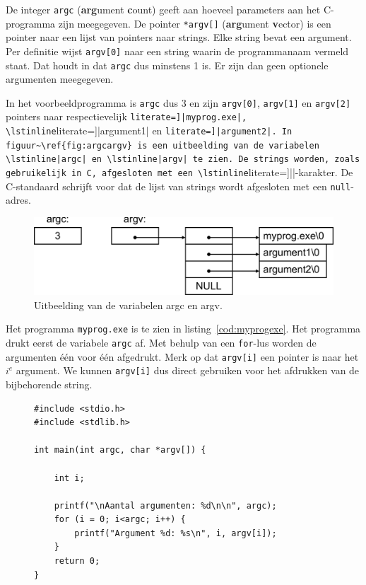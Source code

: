 \documentclass[a4paper,12pt,twoside]{article}
\begin{document}
De integer \lstinline|argc| (\textbf{arg}ument \textbf{c}ount) geeft aan hoeveel
parameters aan het C-programma zijn meegegeven. De pointer \lstinline|*argv[]|
(\textbf{arg}ument \textbf{v}ector) is  een pointer naar een lijst van pointers
naar strings. Elke string bevat een argument. Per definitie wijst \lstinline|argv[0]|
naar een string waarin de programmanaam vermeld staat. Dat houdt in dat \lstinline|argc| dus minstens 1 is.
Er zijn dan geen optionele argumenten meegegeven.

In het voorbeeldprogramma is \lstinline|argc| dus 3 en zijn
\lstinline|argv[0]|, \lstinline|argv[1]| en \lstinline|argv[2]| pointers naar respectievelijk
\lstinline[literate=]|myprog.exe|, \lstinline[literate=]|argument1| en \lstinline[literate=]|argument2|. In
figuur~\ref{fig:argcargv} is een uitbeelding van de variabelen \lstinline|argc|
en \lstinline|argv| te zien. De strings worden, zoals gebruikelijk in C, afgesloten
met een \lstinline[literate=]|\0|-karakter. De C-standaard schrijft voor dat de lijst van strings
wordt afgesloten met een \lstinline|null|-adres.

\begin{figure}[!ht]
\centering
\includegraphics[scale=0.55]{argcargv.pdf}
\caption{Uitbeelding van de variabelen argc en argv.}
\label{fig:argcargv}
\end{figure}

Het programma \lstinline|myprog.exe| is te zien in listing~\ref{cod:myprogexe}. Het
programma drukt eerst de variabele \lstinline|argc| af. Met behulp van een \lstinline|for|-lus
worden de argumenten \'e\'en voor \'e\'en afgedrukt. Merk op dat \lstinline|argv[i]| een
pointer is naar het $i^e$ argument. We kunnen \lstinline|argv[i]| dus direct gebruiken
voor het afdrukken van de bijbehorende string.

\begin{figure}[H]
\begin{lstlisting}[caption=Het programma myprog.exe.,label=cod:myprogexe]
#include <stdio.h>
#include <stdlib.h>

int main(int argc, char *argv[]) {

    int i;

    printf("\nAantal argumenten: %d\n\n", argc);
    for (i = 0; i<argc; i++) {
        printf("Argument %d: %s\n", i, argv[i]);
    }
    return 0;
}
\end{lstlisting}
\end{figure}
\end{document}
